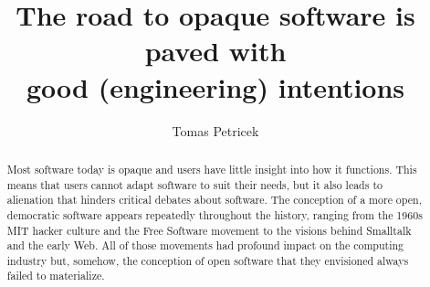 \documentclass[authoryear,preprint,times,12pt]{elsarticle}
\begin{document}
\begin{frontmatter}



\title{The road to opaque software is paved with\\ good (engineering) intentions}


\author{Tomas Petricek} %


\begin{abstract}
Most software today is opaque and users have little insight into how it functions.
This means that users cannot adapt software to suit their needs, but it also leads to alienation
that hinders critical debates about software. The conception of a more open, democratic software
appears repeatedly throughout the history, ranging from the 1960s MIT hacker
culture and the Free Software movement to the visions behind Smalltalk and the early Web.
All of those movements had profound impact on the computing industry but, somehow, the conception
of open software that they envisioned always failed to materialize.


\end{abstract}
\end{frontmatter}
\end{document}
